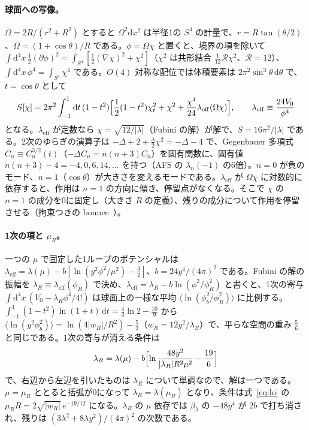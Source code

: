 \documentclass[a4paper,10pt]{ltjsarticle}
\newcommand{\dd}{\mathrm{d}}
\begin{document}
\paragraph{球面への写像。}$\Omega=2R/(r^2+R^2)$ とすると $\Omega^2\dd x^2$ は半径1の $S^4$ の計量で、$r=R\tan(\theta/2)$、$\Omega=(1+\cos\theta)/R$ である。$\phi=\Omega\chi$ と置くと、境界の項を除いて $\int\dd^4x\,\frac12(\partial\phi)^2=\int_{S^4}[\frac12(\nabla\chi)^2+\chi^2]$（$\chi^2$ は共形結合 $\frac1{12}\mathcal R\chi^2$、$\mathcal R=12$）、$\int\dd^4x\,\phi^4=\int_{S^4}\chi^4$ である。$O(4)$ 対称な配位では体積要素は $2\pi^2\sin^3\theta\,\dd\theta$ で、$t=\cos\theta$ として
\begin{equation*}
S[\chi]=2\pi^2\int_{-1}^{1}\dd t\,(1-t^2)\Bigl[\frac12(1-t^2)\chi_t^2+\chi^2+\frac{\chi^4}{24}\lambda_{\mathrm{eff}}(\Omega\chi)\Bigr],\qquad\lambda_{\mathrm{eff}}\equiv\frac{24V_0}{\phi^4}
\end{equation*}
となる。$\lambda_{\mathrm{eff}}$ が定数なら $\chi=\sqrt{12/|\lambda|}$（Fubini の解）が解で、$S=16\pi^2/|\lambda|$ である。2次のゆらぎの演算子は $-\Delta+2+\frac\lambda2\chi^2=-\Delta-4$ で、Gegenbauer 多項式 $C_n\equiv C^{3/2}_n(t)$（$-\Delta C_n=n(n+3)C_n$）を固有関数に、固有値 $n(n+3)-4=-4,0,6,14,\dots$ を持つ（AFS の $\lambda_n(-1)$ の6倍）。$n=0$ が負のモード、$n=1$（$\cos\theta$）が大きさを変えるモードである。$\lambda_{\mathrm{eff}}$ が $\Omega\chi$ に対数的に依存すると、作用は $n=1$ の方向に傾き、停留点がなくなる。そこで $\chi$ の $n=1$ の成分を0に固定し（大きさ $R$ の定義）、残りの成分について作用を停留させる（拘束つきの bounce~\cite{affleck}）。

\paragraph{1次の項と $\mu_R$。}一つの $\mu$ で固定した1ループのポテンシャルは $\lambda_{\mathrm{eff}}=\lambda(\mu)-b[\ln(y^2\phi^2/\mu^2)-\frac32]$、$b=24y^4/(4\pi)^2$ である。Fubini の解の振幅を $\lambda_R\equiv\lambda_{\mathrm{eff}}(\phi_R)$ で決め、$\lambda_{\mathrm{eff}}=\lambda_R-b\ln(\phi^2/\phi_R^2)$ と書くと、1次の寄与 $\int\dd^4x\,(V_0-\lambda_R\phi^4/4!)$ は球面上の一様な平均 $\langle\ln(\phi_b^2/\phi_R^2)\rangle$ に比例する。$\int_{-1}^{1}(1-t^2)\ln(1+t)\,\dd t=\frac43\ln2-\frac{10}{9}$ から $\langle\ln(y^2\phi_b^2)\rangle=\ln(4|w_R|/R^2)-\frac53$（$w_R=12y^2/\lambda_R$）で、平らな空間の重み $\frac56$ と同じである。1次の寄与が消える条件は
\begin{equation*}
\lambda_R=\lambda(\mu)-b\Bigl[\ln\frac{48y^2}{|\lambda_R|R^2\mu^2}-\frac{19}{6}\Bigr]
\end{equation*}
で、右辺から左辺を引いたものは $\lambda_R$ について単調なので、解は一つである。$\mu=\mu_R$ ととると括弧が0になって $\lambda_R=\lambda(\mu_R)$ となり、条件は式~\eqref{eq:lo} の $\mu_RR=2\sqrt{|w_R|}\,e^{-19/12}$ になる。$\lambda_R$ の $\mu$ 依存では $\beta_\lambda$ の $-48y^4$ が $2b$ で打ち消され、残りは $(3\lambda^2+8\lambda y^2)/(4\pi)^2$ の次数である。
\end{document}
